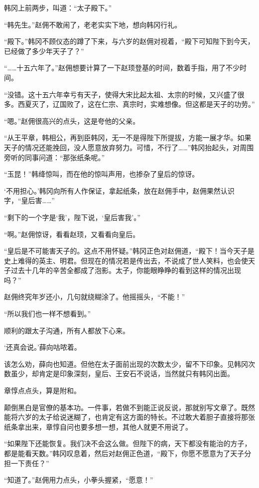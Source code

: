 韩冈上前两步，叫道：“太子殿下。”

“韩先生。”赵佣不敢闹了，老老实实下地，想向韩冈行礼。

“殿下。”韩冈不顾仪态的蹲了下来，与六岁的赵佣对视着，“殿下可知陛下到今天，已经做了多少年天子了？”

“……十五六年了。”赵佣想要计算了一下赵顼登基的时间，数着手指，用了不少时间。

“没错。这十五六年幸亏有天子，使得大宋比起太祖、太宗的时候，又兴盛了很多。西夏灭了，辽国败了，这在仁宗、真宗时，实难想像。但这都是天子的功劳。”

“嗯。”赵佣很高兴的点头，这是夸他的父亲。

“从王平章，韩相公，再到臣韩冈，无一不是得陛下所提拔，方能一展才华。如果天子的情况还能挽回，没人愿意放弃努力。可惜，不行了……”韩冈抬起头，对周围旁听的同事问道：“那张纸条呢。”

“玉昆！”韩绛惊叫，而在他的惊叫声用，也掺杂了皇后的惊讶。

‘不用担心。’韩冈向所有人作保证，拿起纸条，放在赵佣手中，赵佣果然认识字，“皇后害……”

“剩下的一个字是‘我’，陛下说，‘皇后害我’。”

“啊。”赵佣惊讶，看看赵顼，又看看向皇后。

“皇后是不可能害天子的。这点不用怀疑。”韩冈正色对赵佣道，“殿下！当今天子是史上难得的英主、明君。但现在的情况若是传出去，不说成了世人笑料，也会使天子过去十几年的辛苦全都成了泡影。太子，你能眼睁睁的看到这样的情况出现吗？”

赵佣终究年岁还小，几句就绕糊涂了。他摇摇头，“不能！”

“所以我们也一样不想看到。”

顺利的跟太子沟通，所有人都放下心来。

‘还真会说。’薛向咕哝着。

该怎么劝，薛向也知道。但他在太子面前出现的次数太少，留不下印象。见韩冈次数虽少，却肯定是印象深刻，皇后、王安石不说话，当然就只有韩冈出面。

章惇点点头，算是附和。

颠倒黑白是官僚的基本功。一件事，若做不到能正说反说，那就别写文章了。既然能将六岁的太子给说迷糊了，也肯定有这方面的特长。不过敢大着胆子直接将那张纸条拿出来，章惇自问也要多想一想，其他人就更不用说了。

“如果陛下还能恢复。我们决不会这么做。但陛下的病，天下都没有能治的方子，都是能看天数。”韩冈叹息着，然后对赵佣正色道，“殿下，你愿不愿意为了天子分担一下责任？”

“知道了。”赵佣用力点头，小拳头握紧，“愿意！”

